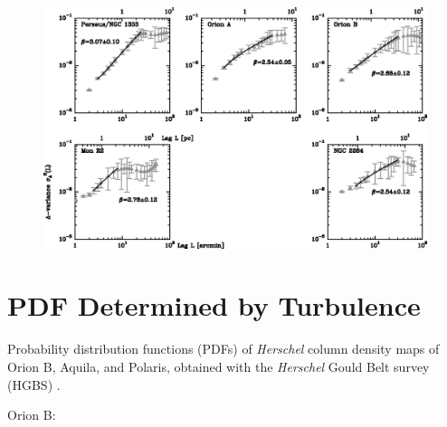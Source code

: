 \documentclass[12pt]{article}
\begin{document}
            \begin{figure}[hb]
              \centering
              \includegraphics[totalheight=80 mm]{img/Bensch_2001_variousregions.eps}
            \end{figure} 
\clearpage
\section{PDF Determined by Turbulence} %
\label{sec:pdf_determined_by_turbulence}
    \begin{small}
    Probability distribution functions (PDFs) of \emph{Herschel} column density maps of Orion B, Aquila, and Polaris, obtained with the \emph{Herschel} Gould Belt survey (HGBS) \citep{2013ApJ...766L..17S}. 
    \end{small}

    Orion B:
\end{document}

